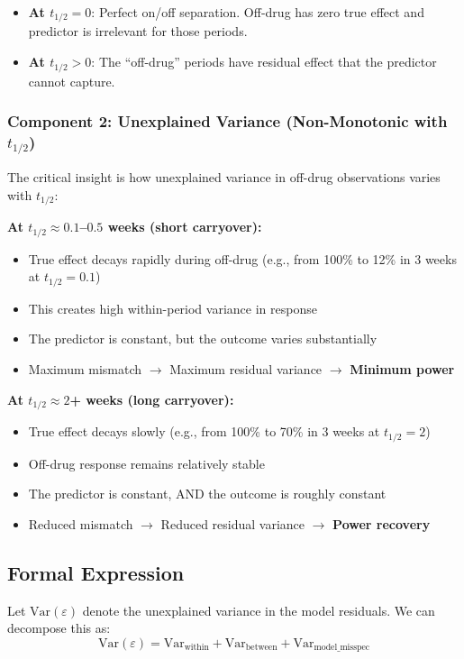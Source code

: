 \documentclass[11pt,a4paper]{article}
\begin{document}
\begin{itemize}
    \item \textbf{At $t_{1/2} = 0$}: Perfect on/off separation. Off-drug has zero true effect and
          predictor is irrelevant for those periods.
    \item \textbf{At $t_{1/2} > 0$}: The ``off-drug'' periods have residual effect that the
          predictor cannot capture.
\end{itemize}

\subsubsection{Component 2: Unexplained Variance (Non-Monotonic with $t_{1/2}$)}

The critical insight is how unexplained variance in off-drug observations
varies with $t_{1/2}$:

\textbf{At $t_{1/2} \approx 0.1$--$0.5$ weeks (short carryover):}
\begin{itemize}
    \item True effect decays rapidly during off-drug (e.g., from 100\% to 12\% in 3 weeks
          at $t_{1/2} = 0.1$)
    \item This creates high within-period variance in response
    \item The predictor is constant, but the outcome varies substantially
    \item Maximum mismatch $\rightarrow$ Maximum residual variance $\rightarrow$ \textbf{Minimum power}
\end{itemize}

\textbf{At $t_{1/2} \approx 2$+ weeks (long carryover):}
\begin{itemize}
    \item True effect decays slowly (e.g., from 100\% to 70\% in 3 weeks at $t_{1/2} = 2$)
    \item Off-drug response remains relatively stable
    \item The predictor is constant, AND the outcome is roughly constant
    \item Reduced mismatch $\rightarrow$ Reduced residual variance $\rightarrow$ \textbf{Power recovery}
\end{itemize}

\subsection{Formal Expression}

Let $\text{Var}(\varepsilon)$ denote the unexplained variance in the model residuals. We can
decompose this as:
\begin{equation}
\text{Var}(\varepsilon) = \text{Var}_{\text{within}} + \text{Var}_{\text{between}} + \text{Var}_{\text{model\_misspec}}
\end{equation}
\end{document}
